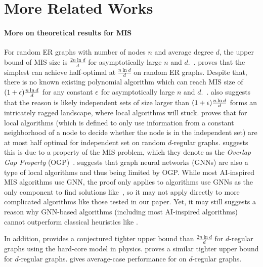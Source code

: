 \section{More Related Works}\label{sec:more-related-works}

\paragraph{More on theoretical results for MIS}
For random ER graphs with number of nodes $n$ and average degree $d$, the upper bound of MIS size is $\frac{2n\ln d}{d}$ for asymptotically large $n$ and $d$.~\citep{coja2015independent}.
\citet{grimmett1975colouring} proves that the simplest \rangreedy can achieve half-optimal at $\frac{n \ln d}{d}$ on random ER graphs. Despite that, there is no known existing polynomial algorithm which can reach MIS size of $(1+{\epsilon})\frac{n \ln d}{d}$ for any constant ${\epsilon}$ for asymptotically large $n$ and $d$.~\citep{coja2015independent}. \citet{coja2015independent} also suggests that the reason is likely independent sets of size larger than $(1+{\epsilon})\frac{n \ln d}{d}$ forms an intricately ragged landscape, where local algorithms will stuck. \citet{gamarnik2014limits, rahman2017local} proves that for local algorithms (which is defined to only use information from a constant neighborhood of a node to decide whether the node is in the independent set) are at most half optimal for independent set on random $d$-regular graphs. \citet{gamarnik2014limits} suggests this is due to a property of the MIS problem, which they denote as the \emph{Overlap Gap Property} (OGP)~\citep{gamarnik2021overlap}. \citet{gamarnik2023barriers} suggests that graph neural networks (GNNs) are also a type of local algorithms and thus being limited by OGP. While most AI-inspired MIS algorithms use GNN, the proof only applies to algorithms use GNNs as the only component to find solutions like~\citep{schuetz2022combinatorial}, so it may not apply directly to more complicated algorithms like those tested in our paper. Yet, it may still suggests a reason why GNN-based algorithms (including most AI-inspired algorithms) cannot outperform classical heuristics like \kamis.

In addition, \citet{barbier2013hard} provides a conjectured tighter upper bound than $\frac{2n\ln d}{d}$ for $d$-regular graphs using the hard-core model in physics. \citet{ding2016maximum} proves a similar tighter upper bound for $d$-regular graphs. \citet{wormald2003analysis} gives average-case performance for \deggreedy on $d$-regular graphs.


